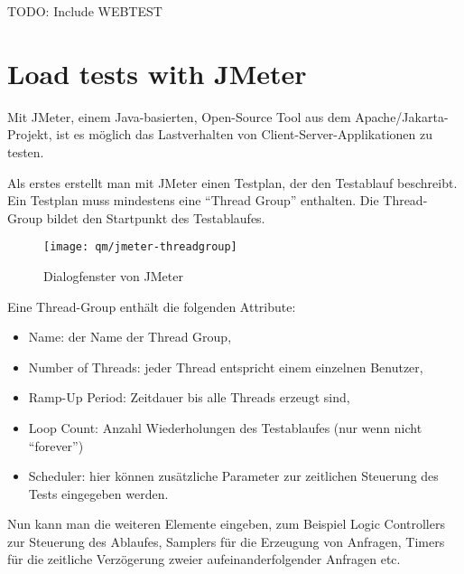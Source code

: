 %
%
\newpage
TODO: Include WEBTEST
\newpage

%
\section{Load tests with JMeter}
Mit JMeter, einem Java-basierten, Open-Source Tool aus dem
Apache/Jakarta-Projekt,  ist es möglich das Lastverhalten von
Client-Server-Applikationen zu testen.

Als erstes erstellt man mit JMeter einen Testplan, der den Testablauf
beschreibt. Ein Testplan muss mindestens eine ``Thread Group'' enthalten.
Die Thread-Group bildet den Startpunkt des Testablaufes.
\begin{figure}[H]
\centering
\texttt{[image: qm/jmeter-threadgroup]}
\caption{Dialogfenster von JMeter}
\end{figure}
\newslide
Eine Thread-Group enthält die folgenden Attribute:
\begin{itemize}
\item Name: der Name der Thread Group,
\item Number of Threads: jeder Thread entspricht einem einzelnen
  Benutzer,%
\item Ramp-Up Period: Zeitdauer bis alle Threads erzeugt sind,
\item Loop Count: Anzahl Wiederholungen des Testablaufes (nur wenn nicht
  ``forever'')
\item Scheduler: hier können zusätzliche Parameter zur zeitlichen Steuerung des
  Tests eingegeben werden.
\end{itemize}
Nun kann man die weiteren Elemente eingeben, zum Beispiel Logic Controllers zur
Steuerung des Ablaufes, Samplers für die Erzeugung von Anfragen, Timers für
die zeitliche Verzögerung zweier aufeinanderfolgender Anfragen etc.

